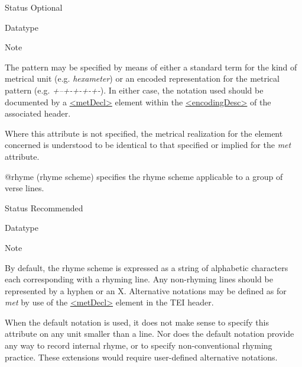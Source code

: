 \begin{reflist}
\begin{sansreflist}
\begin{reflist}
    \item[{Status}]
  Optional
    \item[{Datatype}]
    \item[{Note}]
  \par
The pattern may be specified by means of either a standard term for the kind of metrical unit (e.g. \textit{hexameter}) or an encoded representation for the metrical pattern (e.g. \textit{+--+-+-+-+-}). In either case, the notation used should be documented by a \hyperref[TEI.metDecl]{<metDecl>} element within the \hyperref[TEI.encodingDesc]{<encodingDesc>} of the associated header.\par
Where this attribute is not specified, the metrical realization for the element concerned is understood to be identical to that specified or implied for the {\itshape met} attribute.
\end{reflist}  
    \item[@rhyme]
  (rhyme scheme) specifies the rhyme scheme applicable to a group of verse lines.
\begin{reflist}
    \item[{Status}]
  Recommended
    \item[{Datatype}]
    \item[{Note}]
  \par
By default, the rhyme scheme is expressed as a string of alphabetic characters each corresponding with a rhyming line. Any non-rhyming lines should be represented by a hyphen or an X. Alternative notations may be defined as for {\itshape met} by use of the \hyperref[TEI.metDecl]{<metDecl>} element in the TEI header.\par
When the default notation is used, it does not make sense to specify this attribute on any unit smaller than a line. Nor does the default notation provide any way to record internal rhyme, or to specify non-conventional rhyming practice. These extensions would require user-defined alternative notations.
\end{reflist}  
\end{sansreflist}  
\end{reflist}  
